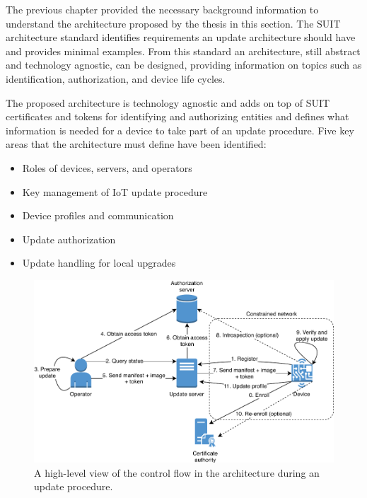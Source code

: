 \documentclass[0-thesis.tex]{subfiles}
\begin{document}
The previous chapter provided the necessary background information to understand the
architecture proposed by the thesis in this section. The SUIT architecture standard
identifies requirements an update architecture should have and provides minimal examples.
From this standard an architecture, still abstract and technology agnostic, can be
designed, providing information on topics such as identification, authorization, and
device life cycles. 

The proposed architecture is technology agnostic and adds on top of SUIT certificates and
tokens for identifying and authorizing entities and defines what information is needed
for a device to take part of an update procedure. Five key areas that the architecture
must define have been identified:

\begin{itemize}
    \item Roles of devices, servers, and operators
    \item Key management of IoT update procedure
    \item Device profiles and communication
    \item Update authorization
    \item Update handling for local upgrades
\end{itemize}

\begin{figure}[t]
    \caption{A high-level view of the control flow in the architecture during an update procedure.}
    \label{fig:communication-workflow}
    \includegraphics{images/update-flow.pdf}
\end{figure}
\end{document}
